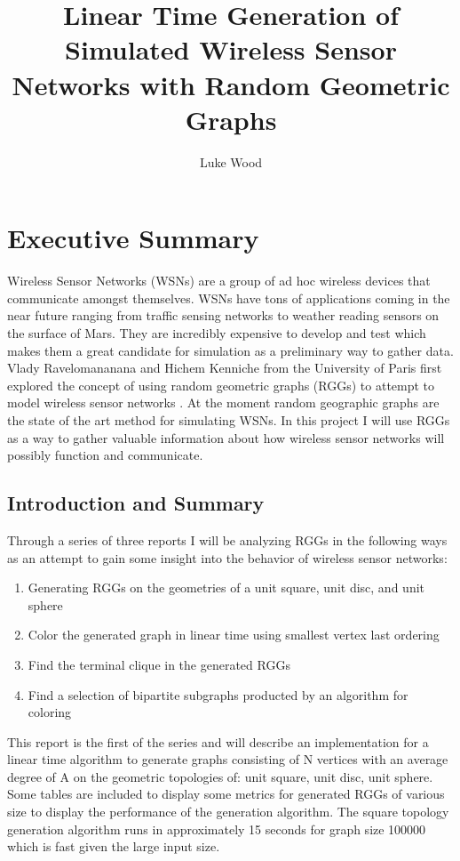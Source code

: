 \documentclass{article}
\begin{document}
  \title{Linear Time Generation of Simulated Wireless Sensor Networks with Random Geometric Graphs}
  \author{Luke Wood}
  \maketitle

  \section{Executive Summary}
	Wireless Sensor Networks (WSNs) are a group of ad hoc wireless devices that communicate amongst themselves.
  WSNs have tons of applications coming in the near future ranging from traffic sensing networks to weather reading sensors on the surface of Mars\cite{mahjoub2010employing}.
	They are incredibly expensive to develop and test which makes them a great candidate for simulation as a preliminary way to gather data.
	Vlady Ravelomananana and Hichem Kenniche from the University of Paris first explored the concept of using random geometric graphs (RGGs) to attempt to model wireless sensor networks \cite{kenniche2010random}.
  At the moment random geographic graphs are the state of the art method for simulating WSNs.
	In this project I will use RGGs as a way to gather valuable information about how wireless sensor networks will possibly function and communicate.

  \subsection{Introduction and Summary}
	Through a series of three reports	I will be analyzing RGGs in the following ways as an attempt to gain some insight into the behavior of wireless sensor networks:
	\begin{enumerate}
		\item Generating RGGs on the geometries of a unit square, unit disc, and unit sphere
		\item Color the generated graph in linear time using smallest vertex last ordering\cite{matula1983smallest}
		\item Find the terminal clique in the generated RGGs
		\item Find a selection of bipartite subgraphs producted by an algorithm for coloring
	\end{enumerate}
	This report is the first of the series and will describe an implementation for a linear time algorithm to generate graphs consisting of N vertices with an average degree of A on the geometric topologies of: unit square, unit disc, unit sphere.
	Some tables are included to display some metrics for generated  RGGs of various size to display the performance of the generation algorithm.
	The square topology generation algorithm runs in approximately 15 seconds for graph size 100000 which is fast given the large input size.
\end{document}
